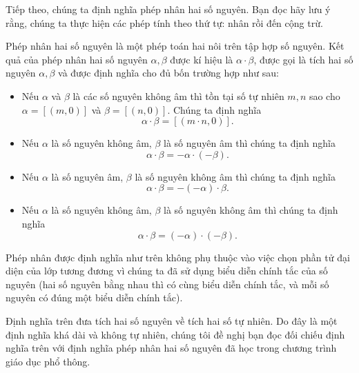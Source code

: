 Tiếp theo, chúng ta định nghĩa phép nhân hai số nguyên. Bạn đọc hãy lưu ý rằng, chúng ta thực hiện các phép tính theo thứ tự: nhân rồi đến cộng trừ.
\begin{definition}
    Phép nhân hai số nguyên là một phép toán hai nôi trên tập hợp số nguyên. Kết quả của phép nhân hai số nguyên $\alpha, \beta$ được kí hiệu là $\alpha\cdot\beta$, được gọi là tích hai số nguyên $\alpha, \beta$ và được định nghĩa cho đủ bốn trường hợp như sau:
    \begin{itemize}[itemsep=0pt]
        \item Nếu $\alpha$ và $\beta$ là các số nguyên không âm thì tồn tại số tự nhiên $m, n$ sao cho $\alpha = [(m, 0)]$ và $\beta = [(n, 0)]$. Chúng ta định nghĩa
              \[
                  \alpha\cdot\beta = [(m\cdot n, 0)].
              \]
        \item Nếu $\alpha$ là số nguyên không âm, $\beta$ là số nguyên âm thì chúng ta định nghĩa
              \[
                  \alpha\cdot\beta = -\alpha\cdot(-\beta).
              \]
        \item Nếu $\alpha$ là số nguyên âm, $\beta$ là số nguyên không âm thì chúng ta định nghĩa
              \[
                  \alpha\cdot\beta = -(-\alpha)\cdot \beta.
              \]
        \item Nếu $\alpha$ là số nguyên không âm, $\beta$ là số nguyên không âm thì chúng ta định nghĩa
              \[
                  \alpha\cdot\beta = (-\alpha)\cdot(-\beta).
              \]
    \end{itemize}
\end{definition}

Phép nhân được định nghĩa như trên không phụ thuộc vào việc chọn phần tử đại diện của lớp tương đương vì chúng ta đã sử dụng biểu diễn chính tắc của số nguyên (hai số nguyên bằng nhau thì có cùng biểu diễn chính tắc, và mỗi số nguyên có đúng một biểu diễn chính tắc).

Định nghĩa trên đưa tích hai số nguyên về tích hai số tự nhiên. Do đây là một định nghĩa khá dài và không tự nhiên, chúng tôi đề nghị bạn đọc đối chiếu định nghĩa trên với định nghĩa phép nhân hai số nguyên đã học trong chương trình giáo dục phổ thông.


